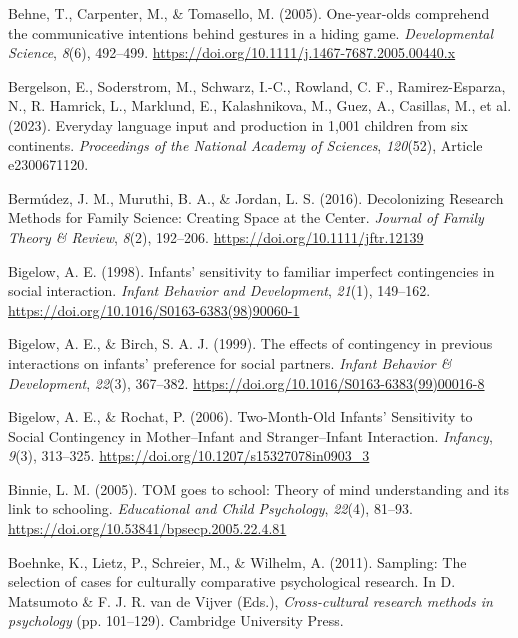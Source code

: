 \documentclass[
]{scrbook}
\newlength{\cslhangindent}
\newenvironment{CSLReferences}[2] %
 {\begin{list}{}{%
  \setlength{\itemindent}{0pt}
  \setlength{\leftmargin}{0pt}
  \setlength{\parsep}{0pt}
  \ifodd #1
   \setlength{\leftmargin}{\cslhangindent}
   \setlength{\itemindent}{-1\cslhangindent}
  \fi
  \setlength{\itemsep}{#2\baselineskip}}}
 {\end{list}}
\begin{document}
\begin{CSLReferences}{1}{0}
Behne, T., Carpenter, M., \& Tomasello, M. (2005). One-year-olds comprehend the communicative intentions behind gestures in a hiding game. \emph{Developmental Science}, \emph{8}(6), 492--499. \url{https://doi.org/10.1111/j.1467-7687.2005.00440.x}

Bergelson, E., Soderstrom, M., Schwarz, I.-C., Rowland, C. F., Ramirez-Esparza, N., R. Hamrick, L., Marklund, E., Kalashnikova, M., Guez, A., Casillas, M., et al. (2023). Everyday language input and production in 1,001 children from six continents. \emph{Proceedings of the National Academy of Sciences}, \emph{120}(52), Article e2300671120.

Bermúdez, J. M., Muruthi, B. A., \& Jordan, L. S. (2016). Decolonizing {Research Methods} for {Family Science}: {Creating Space} at the {Center}. \emph{Journal of Family Theory \& Review}, \emph{8}(2), 192--206. \url{https://doi.org/10.1111/jftr.12139}

Bigelow, A. E. (1998). Infants' sensitivity to familiar imperfect contingencies in social interaction. \emph{Infant Behavior and Development}, \emph{21}(1), 149--162. \url{https://doi.org/10.1016/S0163-6383(98)90060-1}

Bigelow, A. E., \& Birch, S. A. J. (1999). The effects of contingency in previous interactions on infants' preference for social partners. \emph{Infant Behavior \& Development}, \emph{22}(3), 367--382. \url{https://doi.org/10.1016/S0163-6383(99)00016-8}

Bigelow, A. E., \& Rochat, P. (2006). Two-{Month}-{Old Infants}' {Sensitivity} to {Social Contingency} in {Mother}--{Infant} and {Stranger}--{Infant Interaction}. \emph{Infancy}, \emph{9}(3), 313--325. \url{https://doi.org/10.1207/s15327078in0903_3}

Binnie, L. M. (2005). {TOM} goes to school: {Theory} of mind understanding and its link to schooling. \emph{Educational and Child Psychology}, \emph{22}(4), 81--93. \url{https://doi.org/10.53841/bpsecp.2005.22.4.81}

Boehnke, K., Lietz, P., Schreier, M., \& Wilhelm, A. (2011). Sampling: {The} selection of cases for culturally comparative psychological research. In D. Matsumoto \& F. J. R. van de Vijver (Eds.), \emph{Cross-cultural research methods in psychology} (pp. 101--129). Cambridge University Press.


\end{CSLReferences}
\end{document}

